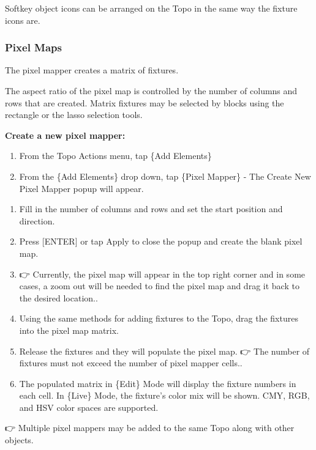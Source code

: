 \documentclass[
]{article}
\begin{document}
Softkey object icons can be arranged on the Topo in the same way the fixture icons are.

\hypertarget{pixel-maps}{%
\subsubsection{Pixel Maps}\label{pixel-maps}}

The pixel mapper creates a matrix of fixtures.

The aspect ratio of the pixel map is controlled by the number of columns and rows that are created.
Matrix fixtures may be selected by blocks using the rectangle or the lasso selection tools.

\textbf{Create a new pixel mapper:}

\begin{enumerate}
\def\labelenumi{\arabic{enumi}.}
\item
  From the Topo Actions menu, tap \{Add Elements\}
\item
  From the \{Add Elements\} drop down, tap \{Pixel Mapper\} - The Create New Pixel Mapper popup will appear.
\end{enumerate}

\begin{enumerate}
\def\labelenumi{\arabic{enumi}.}
\setcounter{enumi}{2}
\item
  Fill in the number of columns and rows and set the start position and direction.
\item
  Press {[}ENTER{]} or tap Apply to close the popup and create the blank pixel map.
\item
  👉 {Currently, the pixel map will appear in the top right corner and in some cases, a zoom out will be needed to find the pixel map and drag it back to the desired location.}.
\item
  Using the same methods for adding fixtures to the Topo, drag the fixtures into the pixel map matrix.
\item
  Release the fixtures and they will populate the pixel map.
  👉 {The number of fixtures must not exceed the number of pixel mapper cells.}.
\item
  The populated matrix in \{Edit\} Mode will display the fixture numbers in each cell. In \{Live\} Mode, the fixture's color mix will be shown. CMY, RGB, and HSV color spaces are supported.
\end{enumerate}

👉 Multiple pixel mappers may be added to the same Topo along with other objects.
\end{document}
